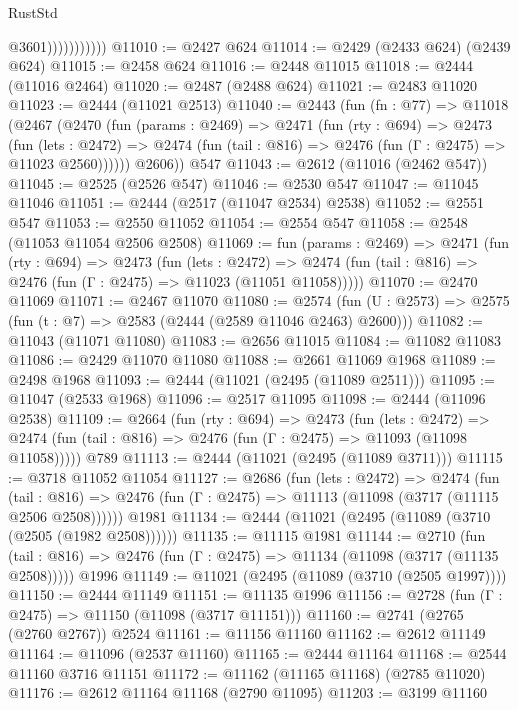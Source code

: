 \begin{lexlean}{RustStd}
\begin{coremodule}
                          @3601)))))))))))
@11010 := @2427 @624
@11014 := @2429 (@2433 @624) (@2439 @624)
@11015 := @2458 @624
@11016 := @2448 @11015
@11018 := @2444 (@11016 @2464)
@11020 := @2487 (@2488 @624)
@11021 := @2483 @11020
@11023 := @2444 (@11021 @2513)
@11040 := @2443
    (fun (fn : @77) =>
    @11018
      (@2467
        (@2470
          (fun (params : @2469) =>
          @2471
            (fun (rty : @694) =>
            @2473
              (fun (lets : @2472) =>
              @2474 (fun (tail : @816) => @2476 (fun (Γ : @2475) => @11023 @2560))))))
        @2606))
    @547
@11043 := @2612 (@11016 (@2462 @547))
@11045 := @2525 (@2526 @547)
@11046 := @2530 @547
@11047 := @11045 @11046
@11051 := @2444 (@2517 (@11047 @2534) @2538)
@11052 := @2551 @547
@11053 := @2550 @11052
@11054 := @2554 @547
@11058 := @2548 (@11053 @11054 @2506 @2508)
@11069 := fun (params : @2469) =>
  @2471
    (fun (rty : @694) =>
    @2473
      (fun (lets : @2472) =>
      @2474 (fun (tail : @816) => @2476 (fun (Γ : @2475) => @11023 (@11051 @11058)))))
@11070 := @2470 @11069
@11071 := @2467 @11070
@11080 := @2574
    (fun (U : @2573) => @2575 (fun (t : @7) => @2583 (@2444 (@2589 @11046 @2463) @2600)))
@11082 := @11043 (@11071 @11080)
@11083 := @2656 @11015
@11084 := @11082 @11083
@11086 := @2429 @11070 @11080
@11088 := @2661 @11069 @1968
@11089 := @2498 @1968
@11093 := @2444 (@11021 (@2495 (@11089 @2511)))
@11095 := @11047 (@2533 @1968)
@11096 := @2517 @11095
@11098 := @2444 (@11096 @2538)
@11109 := @2664
    (fun (rty : @694) =>
    @2473
      (fun (lets : @2472) =>
      @2474 (fun (tail : @816) => @2476 (fun (Γ : @2475) => @11093 (@11098 @11058)))))
    @789
@11113 := @2444 (@11021 (@2495 (@11089 @3711)))
@11115 := @3718 @11052 @11054
@11127 := @2686
    (fun (lets : @2472) =>
    @2474
      (fun (tail : @816) =>
      @2476 (fun (Γ : @2475) => @11113 (@11098 (@3717 (@11115 @2506 @2508))))))
    @1981
@11134 := @2444 (@11021 (@2495 (@11089 (@3710 (@2505 (@1982 @2508))))))
@11135 := @11115 @1981
@11144 := @2710
    (fun (tail : @816) => @2476 (fun (Γ : @2475) => @11134 (@11098 (@3717 (@11135 @2508)))))
    @1996
@11149 := @11021 (@2495 (@11089 (@3710 (@2505 @1997))))
@11150 := @2444 @11149
@11151 := @11135 @1996
@11156 := @2728 (fun (Γ : @2475) => @11150 (@11098 (@3717 @11151)))
@11160 := @2741 (@2765 (@2760 @2767)) @2524
@11161 := @11156 @11160
@11162 := @2612 @11149
@11164 := @11096 (@2537 @11160)
@11165 := @2444 @11164
@11168 := @2544 @11160 @3716 @11151
@11172 := @11162 (@11165 @11168) (@2785 @11020)
@11176 := @2612 @11164 @11168 (@2790 @11095)
@11203 := @3199
    @11160

\end{coremodule}
\end{lexlean}
